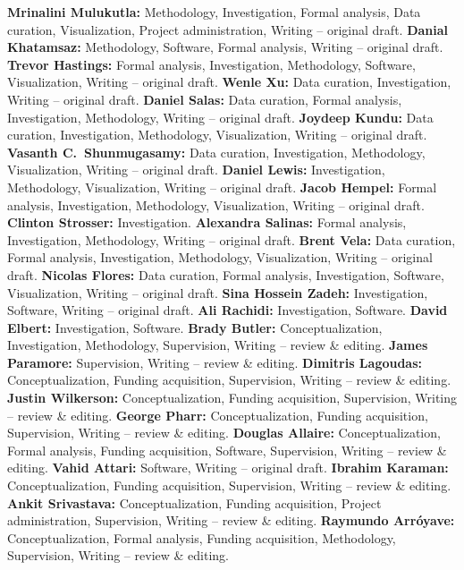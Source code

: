 \documentclass[preprint,12pt,times]{elsarticle}  %
\begin{document}
\textbf{Mrinalini Mulukutla:} Methodology, Investigation, Formal analysis, Data curation, Visualization, Project administration, Writing -- original draft.
\textbf{Danial Khatamsaz:} Methodology, Software, Formal analysis, Writing -- original draft.
\textbf{Trevor Hastings:} Formal analysis, Investigation, Methodology, Software, Visualization, Writing -- original draft.
\textbf{Wenle Xu:} Data curation, Investigation, Writing -- original draft.
\textbf{Daniel Salas:} Data curation, Formal analysis, Investigation, Methodology, Writing -- original draft.
\textbf{Joydeep Kundu:} Data curation, Investigation, Methodology, Visualization, Writing -- original draft.
\textbf{Vasanth C.\ Shunmugasamy:} Data curation, Investigation, Methodology, Visualization, Writing -- original draft.
\textbf{Daniel Lewis:} Investigation, Methodology, Visualization, Writing -- original draft.
\textbf{Jacob Hempel:} Formal analysis, Investigation, Methodology, Visualization, Writing -- original draft.
\textbf{Clinton Strosser:} Investigation.
\textbf{Alexandra Salinas:} Formal analysis, Investigation, Methodology, Writing -- original draft.
\textbf{Brent Vela:} Data curation, Formal analysis, Investigation, Methodology, Visualization, Writing -- original draft.
\textbf{Nicolas Flores:} Data curation, Formal analysis, Investigation, Software, Visualization, Writing -- original draft.
\textbf{Sina Hossein Zadeh:} Investigation, Software, Writing -- original draft.
\textbf{Ali Rachidi:} Investigation, Software.
\textbf{David Elbert:} Investigation, Software.
\textbf{Brady Butler:} Conceptualization, Investigation, Methodology, Supervision, Writing -- review \& editing.
\textbf{James Paramore:} Supervision, Writing -- review \& editing.
\textbf{Dimitris Lagoudas:} Conceptualization, Funding acquisition, Supervision, Writing -- review \& editing.
\textbf{Justin Wilkerson:} Conceptualization, Funding acquisition, Supervision, Writing -- review \& editing.
\textbf{George Pharr:} Conceptualization, Funding acquisition, Supervision, Writing -- review \& editing.
\textbf{Douglas Allaire:} Conceptualization, Formal analysis, Funding acquisition, Software, Supervision, Writing -- review \& editing.
\textbf{Vahid Attari:} Software, Writing -- original draft.
\textbf{Ibrahim Karaman:} Conceptualization, Funding acquisition, Supervision, Writing -- review \& editing.
\textbf{Ankit Srivastava:} Conceptualization, Funding acquisition, Project administration, Supervision, Writing -- review \& editing.
\textbf{Raymundo Arr\'{o}yave:} Conceptualization, Formal analysis, Funding acquisition, Methodology, Supervision, Writing -- review \& editing.
\end{document}
